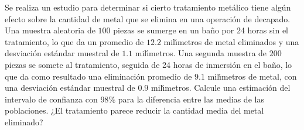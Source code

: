 \begin{enunciado}
 Se realiza un estudio para determinar si cierto tratamiento met\'alico tiene alg\'un efecto sobre la cantidad de metal que se elimina en una operaci\'on de decapado. Una muestra aleatoria de $100$ piezas se sumerge en un baño por 24 horas sin el tratamiento, lo que da un promedio de $12.2$ mil\'{\i}metros de metal eliminados y una desviaci\'on est\'andar muestral de $1.1$ mil\'{\i}metros. Una segunda muestra de $200$ piezas se somete al tratamiento, seguida de 24 horas de inmersi\'on en el baño, lo que da como resultado una eliminaci\'on promedio de $9.1$ mil\'{\i}metros de metal, con una desviaci\'on est\'andar muestral de $0.9$ mil\'{\i}metros. Calcule una estimaci\'on del intervalo de confianza con $98\%$ para la diferencia entre las medias de las poblaciones. ¿El tratamiento parece reducir la cantidad media del metal eliminado?
\end{enunciado}

